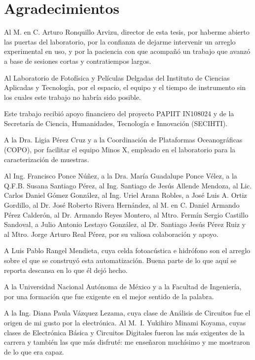 \chapter*{Agradecimientos}
\enlargethispage{\baselineskip}

Al M. en C. Arturo Ronquillo Arvizu, director de esta tesis, por
haberme abierto las puertas del laboratorio, por la confianza de dejarme
intervenir un arreglo experimental en uso, y por la paciencia con que
acompañó un trabajo que avanzó a base de sesiones cortas y contratiempos
largos.

Al Laboratorio de Fotofísica y Películas Delgadas del Instituto de
Ciencias Aplicadas y Tecnología, por el espacio, el equipo y el tiempo de
instrumento sin los cuales este trabajo no habría sido posible.

Este trabajo recibió apoyo financiero del proyecto PAPIIT IN108024 y de
la Secretaría de Ciencia, Humanidades, Tecnología e Innovación (SECIHTI).

A la Dra. Ligia Pérez Cruz y a la Coordinación de Plataformas Oceanográficas
(COPO), por facilitar el equipo Minos X, empleado en el laboratorio para
la caracterización de muestras.

Al Ing. Francisco Ponce Núñez, a la Dra. María Guadalupe Ponce Vélez, a
la Q.F.B. Susana Santiago Pérez, al Ing. Santiago de Jesús Allende
Mendoza, al Lic. Carlos Daniel Gómez González, al Ing. Uriel Arana
Robles, a José Luis A. Ortiz Gordillo, al Dr. José Roberto Rivera
Hernández, al M. en C. Daniel Armando Pérez Calderón, al Dr. Armando
Reyes Montero, al Mtro. Fermín Sergio Castillo Sandoval, a Julio Antonio
Lestayo González, al Dr. Santiago Jesús Pérez Ruiz y al Mtro. Jorge
Arturo Real Pérez, por su valiosa colaboración y apoyo.

A Luis Pablo Rangel Mendieta, cuya celda fotoacústica e hidrófono son el
arreglo sobre el que se construyó esta automatización. Buena parte de lo
que aquí se reporta descansa en lo que él dejó hecho.

A la Universidad Nacional Autónoma de México y a la Facultad de
Ingeniería, por una formación que fue exigente en el mejor sentido de la
palabra.

A la Ing. Diana Paula Vázquez Lezama, cuya clase de Análisis de
Circuitos fue el origen de mi gusto por la electrónica. Al M.~I.
Yukihiro Minami Koyama, cuyas clases de Electrónica Básica y Circuitos
Digitales fueron las más exigentes de la carrera y también las que más
disfruté: me enseñaron muchísimo y me mostraron de lo que era capaz.

